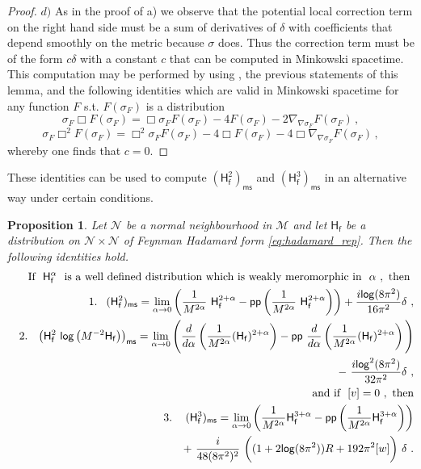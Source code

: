 \documentclass[11pt]{book}
\newcommand{\pp}{\mathsf{pp}}
\newcommand{\ms}{\mathsf{ms}}
\renewcommand{\log}{\mathsf{log}}
\newcommand{\Mcal}{\mathcal{M}}
\newcommand{\Ncal}{\mathcal{N}}
\newcommand{\Hsf}{\mathsf{H}}
\newcommand{\fsf}{\mathsf{f}}
\theoremstyle{break}
\newtheorem{proposition}{Proposition}[chapter]
\begin{document}
{\begin{proof}
$d)$ As in the proof of a) we observe that the potential local correction term on the right hand side must be a sum of derivatives of $\delta$ with coefficients that depend smoothly on the metric because $\sigma$ does. Thus the correction term must be of the form $c\delta$ with a constant $c$ that can be computed in Minkowski spacetime. This computation may be performed by using %
, the previous statements of this lemma, and the following identities which are valid in Minkowski spacetime for any function $F$ s.t. $F(\sigma_F)$ is a distribution
$$\sigma_F\Box  F(\sigma_F)=\Box \sigma_F F(\sigma_F) - 4 F(\sigma_F) - 2\nabla_{\nabla\sigma_F}F(\sigma_F)\,,$$
$$\sigma_F\Box^2  F(\sigma_F)=\Box^2 \sigma_F F(\sigma_F) - 4 \Box F(\sigma_F) - 4\Box \nabla_{\nabla\sigma_F}F(\sigma_F)\,,$$
whereby one finds that $c=0$.
\end{proof}
}


These identities can be used to compute $\left(\Hsf_\fsf^2\right)_\ms$ and $\left(\Hsf_\fsf^3\right)_\ms$ in an alternative way under certain conditions.


\begin{proposition}\label{prop:equivalent_scheme}
Let $\Ncal$ be a normal neighbourhood in $\Mcal$ and let $\Hsf_\fsf$ be a distribution on $\Ncal \times \Ncal$ of Feynman Hadamard form \eqref{eq:hadamard_rep}. Then the following identities hold.
%
\begin{eqnarray*}
%
&& \hspace*{-18pt} \mbox{If } \ \Hsf_\fsf^{\alpha} \ \mbox{ is a well defined distribution which is weakly meromorphic in } \ \alpha \ , \mbox{ then } \\
%
&& 1. \hspace*{8pt} (\Hsf_\fsf^2)_\ms = \lim_{\alpha\to 0} \left( \frac{1}{M^{2\alpha}} \ \Hsf_\fsf^{2+\alpha} - \pp\left(\frac{1}{M^{2\alpha}} \ \Hsf_\fsf^{2+\alpha} \right) \right) + \frac{i\log(8\pi^2)}{16\pi^2} \delta \ , \\
%
&& 2. \hspace*{8pt} \left(\Hsf_\fsf^2 \ \log \left(M^{-2}\Hsf_\fsf\right)\right)_\ms = \lim_{\alpha\to 0} \Bigg(\frac{d}{d\alpha}\left(\frac{1}{M^{2\alpha}}(\Hsf_\fsf)^{2+\alpha}\right) - \pp \ \frac{d}{d\alpha}\left(\frac{1}{M^{2\alpha}}(\Hsf_\fsf)^{2+\alpha}\right)\Bigg) \\
&& \hspace*{145pt} - \ \frac{i\log^2(8\pi^2)}{32\pi^2}\delta \ , \\
%
&& \hspace*{-18pt} \mbox{ and if } \ [v]=0 \ , \ \mbox{then} \\
%
&& 3. \hspace*{12pt} (\Hsf_\fsf^3)_\ms = \lim_{\alpha\to 0}\left(\frac{1}{M^{2\alpha}} \Hsf_\fsf^{3+\alpha} - \pp\left(\frac{1}{M^{2\alpha}} \Hsf_\fsf^{3+\alpha} \right)\right) \\
&& \hspace*{70pt} + \ \frac{i}{48(8\pi^2)^2} \ \bigg((1+2\log(8\pi^2))R+192\pi^2[w]\bigg) \ \delta \ . \\
%
\end{eqnarray*}
%
\end{proposition}
\end{document}

